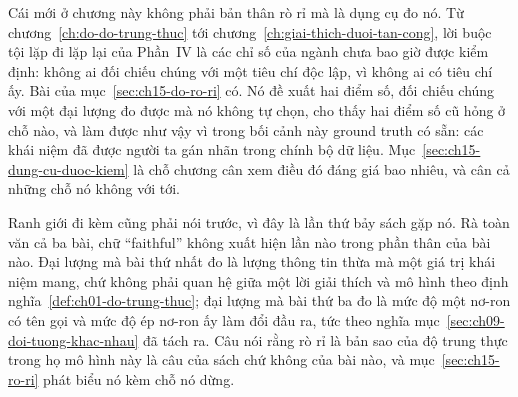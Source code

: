 Cái mới ở chương này không phải bản thân rò rỉ mà là dụng cụ đo nó. Từ
chương~\ref{ch:do-do-trung-thuc} tới chương~\ref{ch:giai-thich-duoi-tan-cong},
lời buộc tội lặp đi lặp lại của Phần~IV là các chỉ số của ngành chưa bao giờ
được kiểm định: không ai đối chiếu chúng với một tiêu chí độc lập, vì không ai
có tiêu chí ấy. Bài của mục~\ref{sec:ch15-do-ro-ri} có. Nó đề xuất hai điểm số,
đối chiếu chúng với một đại lượng đo được mà nó không tự chọn, cho thấy hai điểm
số cũ hỏng ở chỗ nào, và làm được như vậy vì trong bối cảnh này ground truth có
sẵn: các khái niệm đã được người ta gán nhãn trong chính bộ dữ liệu.
Mục~\ref{sec:ch15-dung-cu-duoc-kiem} là chỗ chương cân xem điều đó đáng giá bao
nhiêu, và cân cả những chỗ nó không với tới.

Ranh giới đi kèm cũng phải nói trước, vì đây là lần thứ bảy sách gặp nó. Rà toàn
văn cả ba bài, chữ \enquote{faithful} không xuất hiện lần nào trong phần thân
của bài nào. Đại lượng mà bài thứ nhất đo là lượng thông tin thừa mà một giá trị
khái niệm mang, chứ không phải quan hệ giữa một lời giải thích và mô hình theo
định nghĩa~\ref{def:ch01-do-trung-thuc}; đại lượng mà bài thứ ba đo là mức độ
một nơ-ron có tên gọi và mức độ ép nơ-ron ấy làm đổi đầu ra, tức
 theo nghĩa
mục~\ref{sec:ch09-doi-tuong-khac-nhau} đã tách ra. Câu nói rằng rò rỉ là bản sao
của độ trung thực trong họ mô hình này là câu của sách chứ không của bài nào, và
mục~\ref{sec:ch15-ro-ri} phát biểu nó kèm chỗ nó dừng.









